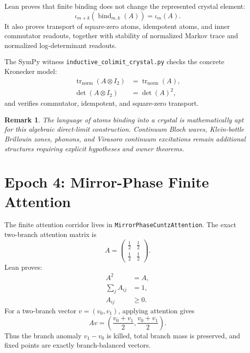 \documentclass[11pt,a4paper]{article}
\newtheorem{remark}[theorem]{Remark}
\begin{document}
Lean proves that finite binding does not change the represented crystal element:
\begin{equation}
  \iota_{m+k}(\operatorname{bind}_{m,k}(A)) = \iota_m(A).
\end{equation}
It also proves transport of square-zero atoms, idempotent atoms, and inner
commutator readouts, together with stability of normalized Markov trace and
normalized log-determinant readouts.

The SymPy witness \texttt{inductive\_colimit\_crystal.py} checks the concrete
Kronecker model:
\begin{align}
  \operatorname{tr}_{\mathrm{norm}}(A \otimes I_2) &=
    \operatorname{tr}_{\mathrm{norm}}(A), \\
  \det(A \otimes I_2) &= \det(A)^2,
\end{align}
and verifies commutator, idempotent, and square-zero transport.

\begin{remark}
The language of atoms binding into a crystal is mathematically apt for this
algebraic direct-limit construction.  Continuum Bloch waves, Klein-bottle
Brillouin zones, phonons, and Virasoro continuum excitations remain additional
structures requiring explicit hypotheses and owner theorems.
\end{remark}

\section{Epoch 4: Mirror-Phase Finite Attention}

The finite attention corridor lives in \texttt{MirrorPhaseCuntzAttention}.  The
exact two-branch attention matrix is
\begin{equation}
  A = \begin{pmatrix}
    \frac12 & \frac12 \\
    \frac12 & \frac12
  \end{pmatrix}.
\end{equation}
Lean proves:
\begin{align}
  A^2 &= A, \\
  \sum_j A_{ij} &= 1, \\
  A_{ij} &\ge 0.
\end{align}
For a two-branch vector $v=(v_0,v_1)$, applying attention gives
\begin{equation}
  Av = \left(\frac{v_0+v_1}{2},\frac{v_0+v_1}{2}\right).
\end{equation}
Thus the branch anomaly $v_1-v_0$ is killed, total branch mass is preserved, and
fixed points are exactly branch-balanced vectors.
\end{document}
